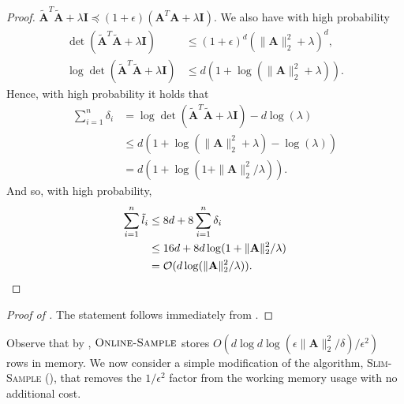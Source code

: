 \documentclass{toc}
\newcommand{\Oh}{\ensuremath{\mathcal{O}}}
\newcommand{\bv}[1]{\mathbf{#1}}
\newcommand{\norm}[1]{\|#1\|}
\begin{document}
\begin{proof}
    $
        \bv{\tilde{A}}^T\tilde{\bv{A}} + \lambda \bv{I} \preceq (1+\epsilon)(\bv{A}^T\bv{A} + \lambda \bv{I}).
    $
    We also have with high probability
    \begin{align*}
        \det (\bv{\tilde{A}}^T\tilde{\bv{A}} + \lambda \bv{I}) &\leq (1+\epsilon)^d(\norm{\bv{A}}_2^2 + \lambda)^d,\\
        \log \det (\bv{\tilde{A}}^T\tilde{\bv{A}} + \lambda \bv{I}) &\leq d(1 + \log(\norm{\bv{A}}_2^2 + \lambda)).
    \end{align*}
    Hence, with high probability it holds that
    \begin{align*}
        \sum_{i=1}^n \delta_i &= \log \det (\bv{\tilde{A}}^T\tilde{\bv{A}} + \lambda \bv{I}) - d \log(\lambda)\\
                              &\leq d(1 + \log(\norm{\bv A}_2^2 + \lambda) - \log(\lambda))\\
                              &= d(1 + \log(1 + \norm{\bv A}_2^2 / \lambda)).
    \end{align*}
    And so, with high probability,
    \begin{align*}
        \sum_{i=1}^n \tilde{l}_i &\leq 8d + 8\sum_{i=1}^n \delta_i\\
                                 &\leq 16d + 8d\log(1 + \norm{\bv A}_2^2 / \lambda)\\
                                 &= \Oh(d \log(\norm{\bv A}_2^2 / \lambda)). \qedhere
    \end{align*}
\end{proof}
%

\begin{proof}[Proof of ]
The statement follows immediately from
 .
\end{proof}

Observe that by , $\textsc{Online-Sample}$ stores $O(d \log d \log(\epsilon \norm{\bv{A}}_2^2/\delta)/\epsilon^2)$ rows in memory. 
We now consider a simple modification of the algorithm, \textsc{Slim-Sample}  (), that removes the $1/\epsilon^2$ factor from the working memory usage with no additional cost.
\end{document}
